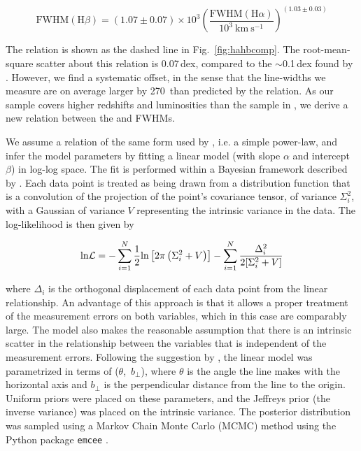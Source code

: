 \begin{equation}
  \mathrm{FWHM}(\mathrm{H}\beta) = \left( 1.07 \pm 0.07 \right) \times 10^3 \left( \frac{ \mathrm{FWHM}(\mathrm{H}\alpha) }{10^3 ~\mathrm{km}~\mathrm{s}^{-1} } \right)^{(1.03 \pm 0.03)}
\end{equation}

The relation is shown as the dashed line in Fig.~\ref{fig:hahbcomp}.
The root-mean-square scatter about this relation is 0.07\,dex, compared to the $\sim$0.1\,dex found by \citet{greene05b}. 
However, we find a systematic offset, in the sense that the \hb line-widths we measure are on average larger by 270\kms\, than predicted by the \citet{greene05b} relation. 
As our sample covers higher redshifts and luminosities than the sample in \citet{greene05b}, we derive a new relation between the \ha and \hb FWHMs.       

We assume a relation of the same form used by \citet{greene05b}, i.e. a simple power-law, and infer the model parameters by fitting a linear model (with slope $\alpha$ and intercept $\beta$) in log-log space.
The fit is performed within a Bayesian framework described by \citet{hogg10}. 
Each data point is treated as being drawn from a distribution function that is a convolution of the projection of the point's covariance tensor, of variance $\Sigma_i^2$, with a Gaussian of variance $V$ representing the intrinsic variance in the data.
The log-likelihood is then given by 

\begin{equation}
  {\rm ln} {\cal L} = - \sum_{i=1}^N \frac{1}{2} {\rm ln}\left[2\pi\left(\Sigma_i^2 + V\right)\right] - \sum_{i=1}^N \frac{\Delta_i^2}{2[\Sigma_i^2 + V]} 
\end{equation}

\noindent where $\Delta_i$ is the orthogonal displacement of each data point from the linear relationship. 
An advantage of this approach is that it allows a proper treatment of the measurement errors on both variables, which in this case are comparably large.
The model also makes the reasonable assumption that there is an intrinsic scatter in the relationship between the variables that is independent of the measurement errors.  
Following the suggestion by \citet{hogg10}, the linear model was parametrized in terms of ($\theta$,~$b_\bot$), where $\theta$ is the angle the line makes with the horizontal axis and $b_\bot$ is the perpendicular distance from the line to the origin.
Uniform priors were placed on these parameters, and the Jeffreys prior (the inverse variance) was placed on the intrinsic variance. 
The posterior distribution was sampled using a Markov Chain Monte Carlo (MCMC) method using the Python package {\tt emcee} \citep{foreman13}. 
 

